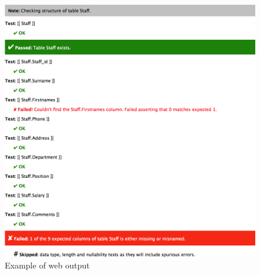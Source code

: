 \documentclass[sigconf, authordraft]{acmart}
\begin{document}
\begin{figure}
    \includegraphics[width=0.95\columnwidth,keepaspectratio]{images/web_output.png}
    \caption{Example of web output}
\end{figure}
\end{document}

